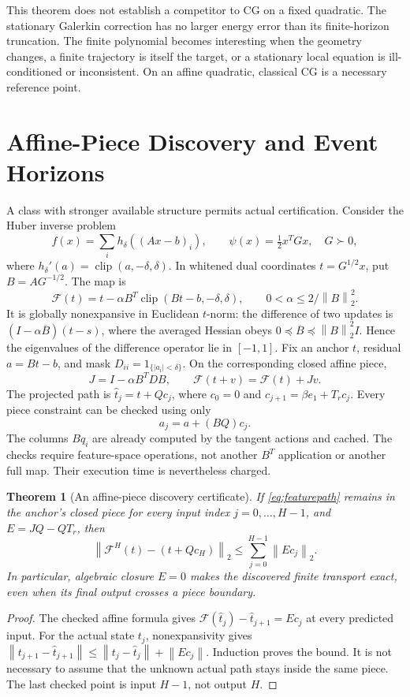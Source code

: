 \documentclass[journal]{IEEEtran}
\newtheorem{theorem}{Theorem}
\theoremstyle{definition}
\newcommand{\norm}[1]{\left\lVert#1\right\rVert}
\newcommand{\F}{\mathcal{F}}
\begin{document}
This theorem does not establish a competitor to CG on a fixed quadratic.
The stationary Galerkin correction has no larger energy error than its
finite-horizon truncation. The finite polynomial becomes interesting when
the geometry changes, a finite trajectory is itself the target, or a
stationary local equation is ill-conditioned or inconsistent. On an affine
quadratic, classical CG is a necessary reference point.


\section{Affine-Piece Discovery and Event Horizons}\label{app:huber}
A class with stronger available structure permits actual certification.
Consider the Huber inverse problem
\[
 f(x)=\sum_i h_\delta((Ax-b)_i),\qquad
 \psi(x)=\tfrac12 x^TGx,\quad G\succ0,
\]
where $h_\delta'(a)=\operatorname{clip}(a,-\delta,\delta)$.
In whitened dual coordinates $t=G^{1/2}x$, put $B=AG^{-1/2}$. The map is
\begin{equation}
 \F(t)=t-\alpha B^T\operatorname{clip}(Bt-b,-\delta,\delta),
 \qquad 0<\alpha\leq 2/\norm{B}_2^2. \label{eq:huber}
\end{equation}
It is globally nonexpansive in Euclidean $t$-norm: the difference of two
updates is $(I-\alpha\overline B)(t-s)$, where the averaged Hessian obeys
$0\preceq\overline B\preceq\norm{B}_2^2 I$. Hence the eigenvalues of the
difference operator lie in $[-1,1]$. Fix an anchor $t$, residual $a=Bt-b$, and mask
$D_{ii}=1_{\{|a_i|<\delta\}}$. On the corresponding closed affine piece,
\[
 J=I-\alpha B^TDB,\qquad
 \F(t+v)=\F(t)+Jv.
\]
The projected path is $\widehat t_j=t+Qc_j$, where
$c_0=0$ and $c_{j+1}=\beta e_1+T_r c_j$.
Every piece constraint can be checked using only
\begin{equation}
 a_j=a+(BQ)c_j. \label{eq:featurepath}
\end{equation}
The columns $Bq_i$ are already computed by the tangent actions and cached.
The checks require feature-space operations, not another $B^T$ application
or another full map. Their execution time is nevertheless charged.

\begin{theorem}[An affine-piece discovery certificate]\label{thm:piece}
If \eqref{eq:featurepath} remains in the anchor's closed piece for every
input index $j=0,\ldots,H-1$, and $E=JQ-QT_r$, then
\begin{equation}
 \norm{\F^H(t)-(t+Qc_H)}_2
 \leq \sum_{j=0}^{H-1}\norm{Ec_j}_2. \label{eq:piecebound}
\end{equation}
In particular, algebraic closure $E=0$ makes the discovered finite
transport exact, even when its final output crosses a piece boundary.
\end{theorem}
\begin{proof}
The checked affine formula gives
$\F(\widehat t_j)-\widehat t_{j+1}=Ec_j$ at every predicted input.
For the actual state $t_j$, nonexpansivity gives
$\norm{t_{j+1}-\widehat t_{j+1}}
\leq\norm{t_j-\widehat t_j}+\norm{Ec_j}$.
Induction proves the bound. It is not necessary to assume that the
unknown actual path stays inside the same piece. The last checked point
is input $H-1$, not output $H$.
\end{proof}
\end{document}
